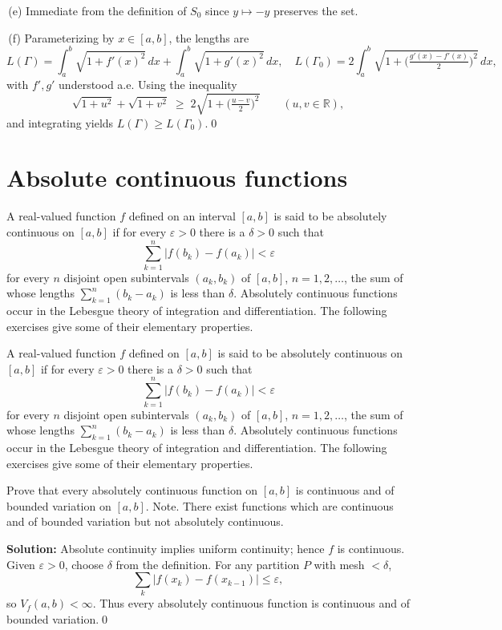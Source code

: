 \,(e) Immediate from the definition of $S_0$ since $y\mapsto -y$ preserves the set.

\,(f) Parameterizing by $x\in[a,b]$, the lengths are
\[L(\Gamma)=\int_a^b\!\sqrt{1+f'(x)^2}\,dx+\int_a^b\!\sqrt{1+g'(x)^2}\,dx,\quad L(\Gamma_0)=2\int_a^b\!\sqrt{1+\Big(\tfrac{g'(x)-f'(x)}{2}\Big)^{\!2}}\,dx,
\]
with $f',g'$ understood a.e. Using the inequality
\[\sqrt{1+u^2}+\sqrt{1+v^2}\;\ge\;2\sqrt{1+\Big(\tfrac{u-v}{2}\Big)^{\!2}}\qquad(u,v\in\mathbb{R}),\]
and integrating yields $L(\Gamma)\ge L(\Gamma_0)$.\qed
\section{Absolute continuous functions}
A real-valued function $f$ defined on an interval $[a,b]$ is said to be absolutely continuous on $[a,b]$ if for every $\varepsilon > 0$ there is a $\delta > 0$ such that
\[\sum_{k=1}^{n} |f(b_k) - f(a_k)| < \varepsilon\]
for every $n$ disjoint open subintervals $(a_k, b_k)$ of $[a, b]$, $n = 1, 2, \ldots$, the sum of whose lengths $\sum_{k=1}^{n} (b_k - a_k)$ is less than $\delta$.
Absolutely continuous functions occur in the Lebesgue theory of integration and differentiation. The following exercises give some of their elementary properties.



\begin{problembox}
A real-valued function $f$ defined on $[a, b]$ is said to be absolutely continuous on $[a, b]$ if for every $\varepsilon > 0$ there is a $\delta > 0$ such that
\[\sum_{k=1}^{n} |f(b_k) - f(a_k)| < \varepsilon\]
for every $n$ disjoint open subintervals $(a_k, b_k)$ of $[a, b]$, $n = 1, 2, \ldots$, the sum of whose lengths $\sum_{k=1}^{n} (b_k - a_k)$ is less than $\delta$. Absolutely continuous functions occur in the Lebesgue theory of integration and differentiation. The following exercises give some of their elementary properties.

Prove that every absolutely continuous function on $[a, b]$ is continuous and of bounded variation on $[a, b]$. Note. There exist functions which are continuous and of bounded variation but not absolutely continuous.
\end{problembox}

\noindent\textbf{Solution:}
Absolute continuity implies uniform continuity; hence $f$ is continuous. Given $\varepsilon>0$, choose $\delta$ from the definition. For any partition $P$ with mesh $<\delta$,
\[\sum_k |f(x_k)-f(x_{k-1})|\le\varepsilon,\]
so $V_f(a,b)<\infty$. Thus every absolutely continuous function is continuous and of bounded variation.\qed


